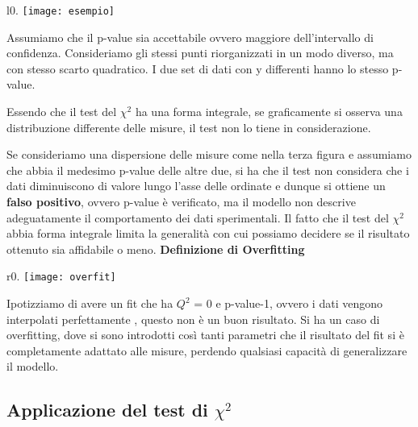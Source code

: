 \begin{wrapfigure}[18]{l}{0.\textwidth}
\centering
\texttt{[image: esempio]}	
\end{wrapfigure}

Assumiamo che il p-value sia accettabile ovvero maggiore
dell'intervallo di confidenza. Consideriamo gli stessi punti 
riorganizzati in un modo diverso, ma con stesso scarto quadratico.
I due set di dati con y differenti hanno lo stesso p-value.

Essendo che il test del $\chi^2$ ha una forma integrale, se
graficamente si osserva una distribuzione differente delle
misure, il test non lo tiene in considerazione.

Se consideriamo una dispersione delle misure come nella terza figura e
assumiamo che abbia il medesimo p-value delle altre due, si ha
che il test non considera che i dati diminuiscono di valore lungo l'asse delle ordinate e dunque si ottiene un \textbf{falso positivo}, ovvero p-value \`{e} verificato, ma il modello non descrive adeguatamente il comportamento dei dati sperimentali.
Il fatto che il test del $\chi^2$ abbia forma integrale limita la generalit\`{a} con cui possiamo decidere se il risultato ottenuto sia affidabile o meno.
\newline
\newline
\textbf{Definizione di Overfitting}

\begin{wrapfigure}{r}{0.\textwidth}
\centering
\texttt{[image: overfit]}	
\end{wrapfigure}
\vspace{0.05in}

\noindent Ipotizziamo di avere un fit che ha $Q^2$ = 0 e p-value-1,
ovvero i dati vengono interpolati perfettamente , questo non \`{e}
un buon risultato. Si ha un caso di overfitting, dove si sono introdotti così tanti parametri che
il risultato del fit si \`{e} completamente adattato alle misure, perdendo qualsiasi
capacit\`{a} di generalizzare il modello. 

\subsection{Applicazione del test di $\chi^2$}

